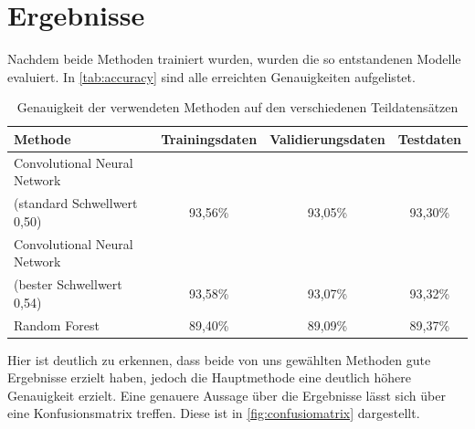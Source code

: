 \section{Ergebnisse}
\label{sec:Ergebnisse}

Nachdem beide Methoden trainiert wurden, wurden die so entstandenen Modelle evaluiert.
In \autoref{tab:accuracy} sind alle erreichten Genauigkeiten aufgelistet.

\begin{table}
    \centering
    \caption{Genauigkeit der verwendeten Methoden auf den verschiedenen Teildatensätzen}
    \label{tab:accuracy}
    \begin{tabular}{l c c c}
        \toprule 
        Methode & Trainingsdaten & Validierungsdaten & Testdaten \\ 
        \midrule 
        Convolutional Neural Network \\ (standard Schwellwert 0,50) & 93,56\% & 93,05\% & 93,30\% \\
        Convolutional Neural Network \\ (bester Schwellwert 0,54) & 93,58\% & 93,07\% & 93,32\% \\
        Random Forest & 89,40\% & 89,09\% & 89,37\% \\
        \bottomrule
    \end{tabular}
\end{table}

Hier ist deutlich zu erkennen, dass beide von uns gewählten Methoden gute Ergebnisse erzielt haben, jedoch die Hauptmethode eine deutlich höhere Genauigkeit erzielt.
Eine genauere Aussage über die Ergebnisse lässt sich über eine Konfusionsmatrix treffen. Diese ist in \autoref{fig:confusiomatrix} dargestellt.

